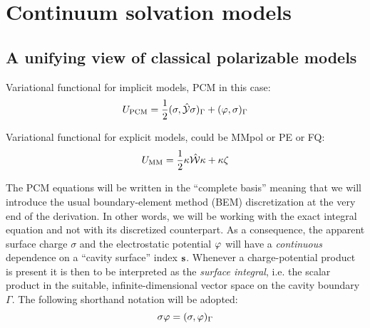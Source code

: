 \chapter{Continuum solvation models}\label{ch:CSM}

\section{A unifying view of classical polarizable
models}\label{sec:variational}

Variational functional for implicit models, \acs{PCM} in this case:
\begin{equation}
 U_\mathrm{PCM} = \frac{1}{2}(\sigma, \hat{\mathcal{Y}}\sigma)_{\Gamma} + (\varphi, \sigma)_{\Gamma}
\end{equation}

Variational functional for explicit models, could be MMpol or PE or FQ:
\begin{equation}
  U_\mathrm{MM} = \frac{1}{2}\kappa\hat{\mathcal{W}}\kappa + \kappa\zeta
\end{equation}

The PCM equations will be written in the ``complete basis'' meaning that
we will introduce the usual boundary-element method (BEM) discretization
at the very end of the derivation. In other words, we will be working
with the exact integral equation and not with its discretized
counterpart. As a consequence, the apparent surface charge $\sigma$ and
the electrostatic potential $\varphi$ will have a \emph{continuous}
dependence on a ``cavity surface'' index $\mathbf{s}$. Whenever a
charge-potential product is present it is then to be interpreted as the
\emph{surface integral}, i.e. the scalar product in the suitable,
infinite-dimensional vector space on the cavity boundary $\Gamma$. The
following shorthand notation will be adopted:
\begin{equation}
 \sigma\varphi = (\sigma, \varphi)_{\Gamma}
\end{equation}

